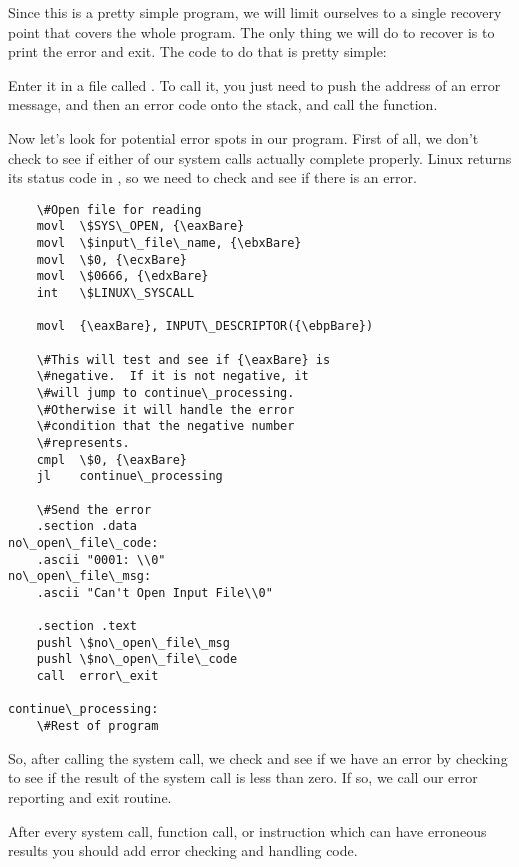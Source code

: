 Since this is a pretty simple program, we will limit ourselves to
a single recovery point that covers the whole program.  The only thing
we will do to recover is to print the error and exit.  The code to
do that is pretty simple:

\begin{simpletyping}

\end{simpletyping}

Enter it in a file called .  To call it,
you just need to push the address of an error message, and then an error
code onto the stack, and call the function.

Now let's look for potential error spots in our  
program.  First of all, we don't check
to see if either of our  system calls actually 
complete properly.  Linux returns its status code in {\eaxRegIdx}, so
we need to check and see if there is an error.

\begin{simpletyping}
\begin{lstlisting}
	\#Open file for reading
	movl  \$SYS\_OPEN, {\eaxBare}
	movl  \$input\_file\_name, {\ebxBare}
	movl  \$0, {\ecxBare}
	movl  \$0666, {\edxBare}
	int   \$LINUX\_SYSCALL

	movl  {\eaxBare}, INPUT\_DESCRIPTOR({\ebpBare})

	\#This will test and see if {\eaxBare} is
	\#negative.  If it is not negative, it
	\#will jump to continue\_processing.
	\#Otherwise it will handle the error
	\#condition that the negative number
	\#represents.
	cmpl  \$0, {\eaxBare}
	jl    continue\_processing

	\#Send the error
	.section .data
no\_open\_file\_code:
	.ascii "0001: \\0"
no\_open\_file\_msg:
	.ascii "Can't Open Input File\\0"

	.section .text
	pushl \$no\_open\_file\_msg
	pushl \$no\_open\_file\_code
	call  error\_exit

continue\_processing:
	\#Rest of program
\end{lstlisting}
\end{simpletyping}

So, after calling the system call, we check and see if we have an
error by checking to see if the result of the system call is 
less than zero.  If so, we call our error reporting and exit routine.

After every system call, 
function call, 
or instruction 
which can have erroneous
results you should add error checking and handling code.  

